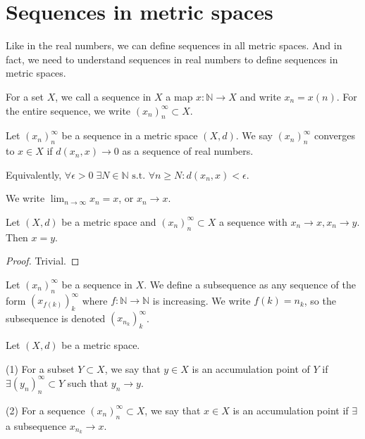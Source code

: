 \section{Sequences in metric spaces}

Like in the real numbers, we can define sequences in all metric spaces. And in fact, we need to understand sequences in real numbers to define sequences in metric spaces. 

\begin{definition}[Sequence]\label{def:sequence}
    For a set $X$, we call a sequence in $X$ a map $x: \mathbb{N} \to X$ and write $x_{n} = x(n)$. For the entire sequence, we write $(x_{n})_{n}^{\infty} \subset X$.
\end{definition}

\begin{definition}\label{def:conv_lim}
    Let $(x_{n})_{n}^{\infty}$ be a sequence in a metric space $(X,d)$. We say $(x_{n})_{n}^{\infty}$ converges to $x \in X$ if $d(x_{n}, x) \to 0$ as a sequence of real numbers.

    Equivalently, $\forall \epsilon > 0 \;  \exists N \in \mathbb{N} \text{ s.t. } \forall n \geq N: d(x_{n}, x) < \epsilon$.

    We write $\lim_{n \to \infty} x_{n} = x$, or $x_{n} \to x$. 
\end{definition}


\begin{lemma}\label{lem:lim_unique}
    Let $(X, d)$ be a metric space and $(x_{n})_{n}^{\infty} \subset X$ a sequence with $x_{n} \to x, x_{n} \to y$. Then $x = y$. 
\end{lemma}
\begin{proof}
    Trivial.
\end{proof}

\begin{definition}[Subsequence]\label{def:subsequence}
    Let $(x_{n})_{n}^{\infty}$ be a sequence in $X$. We define a subsequence as any sequence of the form $\left(x_{f(k)}\right)_{k}^{\infty}$ where $f: \mathbb{N} \to \mathbb{N}$ is increasing. We write $f(k) = n_{k}$, so the subsequence is denoted $\left(x_{n_{k}}\right)_{k}^{\infty}$.
\end{definition}

\begin{definition}\label{def:acc_point}
    Let $(X,d)$ be a metric space.

    (1) For a subset $Y \subset X$, we say that $y \in X$ is an accumulation point of $Y$ if $\exists (y_{n})_{n}^{\infty} \subset Y$ such that $y_{n} \to y$.

    (2) For a sequence $(x_{n})_{n}^{\infty} \subset X$, we say that $x \in X$ is an accumulation point if $\exists$ a subsequence $x_{n_{k}} \to x$. 
\end{definition}

